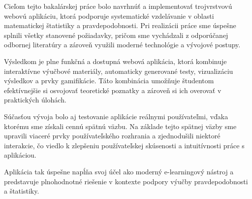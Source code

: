 Cieľom tejto bakalárskej práce bolo navrhnúť a implementovať trojvrstvovú webovú aplikáciu, ktorá podporuje systematické vzdelávanie v oblasti matematickej štatistiky a pravdepodobnosti. Pri realizácii práce sme úspešne splnili všetky stanovené požiadavky, pričom sme vychádzali z odporúčanej odbornej literatúry a zároveň využili moderné technológie a vývojové postupy.

Výsledkom je plne funkčná a dostupná webová aplikácia, ktorá kombinuje interaktívne výučbové materiály, automaticky generované testy, vizualizáciu výsledkov a prvky gamifikácie. Táto kombinácia umožňuje študentom efektívnejšie si osvojovať teoretické poznatky a zároveň si ich overovať v praktických úlohách.

Súčasťou vývoja bolo aj testovanie aplikácie reálnymi používateľmi, vďaka ktorému sme získali cennú spätnú väzbu. Na základe tejto spätnej väzby sme upravili viaceré prvky používateľského rozhrania a zjednodušili niektoré interakcie, čo viedlo k zlepšeniu používateľskej skúsenosti a intuitívnosti práce s aplikáciou.

Aplikácia tak úspešne napĺňa svoj účel ako moderný e-learningový nástroj a predstavuje plnohodnotné riešenie v kontexte podpory výučby pravdepodobnosti a štatistiky.